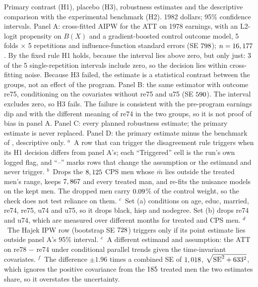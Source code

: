 \documentclass[11pt]{article}
\begin{document}
\begin{table}[tbp]
\centering
\caption{Primary contrast (H1), placebo (H3), robustness estimates and the descriptive
comparison with the experimental benchmark (H2). 1982 dollars; 95\% confidence intervals.
Panel A: cross-fitted AIPW for the ATT on 1978 earnings, with an L2-logit propensity on
$B(X)$ and a gradient-boosted control outcome model, 5 folds $\times$ 5 repetitions and
influence-function standard errors (SE $\PrimarySe$); $n = \PrimaryN$. By the fixed rule H1
holds, because the interval lies above zero, but only just: $\PrimaryNRepsCiIncludeZero$ of
the 5 single-repetition intervals include zero, so the decision lies within cross-fitting
noise. Because H3 failed, the estimate is a statistical contrast between the groups, not an
effect of the program. Panel B: the same estimator with outcome re75, conditioning on the
covariates without re75 and u75 (SE $\PlaceboSe$). The interval excludes zero, so H3 fails.
The failure is consistent with the pre-program earnings dip and with the different meaning
of re74 in the two groups, so it is not proof of bias in panel A. Panel C: every planned
robustness estimate; the primary estimate is never replaced. Panel D: the primary estimate
minus the benchmark of \citet[Table~3]{dehejia1999}, descriptive only.
$^{a}$~A row that can trigger the disagreement rule triggers when its H1 decision differs
from panel A's; each ``Triggered'' cell is the run's own logged flag, and ``--'' marks rows
that change the assumption or the estimand and never trigger.
$^{b}$~Drops the $\TrimNControlDropped$ CPS men whose $\bar m$ lies outside the treated
men's range, keeps $\TrimNControlKept$ and every treated man, and re-fits the nuisance
models on the kept men. The dropped men carry $\TrimDroppedWeightShare$\% of the control
weight, so the check does not test reliance on them.
$^{c}$~Set (a) conditions on age, educ, married, re74, re75, u74 and u75, so it drops black,
hisp and nodegree. Set (b) drops re74 and u74, which are measured over different months for
treated and CPS men.
$^{d}$~The Hajek IPW row (bootstrap SE $\IpwSe$) triggers only if its point estimate lies
outside panel A's 95\% interval.
$^{e}$~A different estimand and assumption: the ATT on re78 $-$ re74 under conditional
parallel trends given the time-invariant covariates.
$^{f}$~The difference $\pm 1.96$ times a combined SE of $\HTwoSeCombined$,
$\sqrt{\mathrm{SE}^2 + \HTwoBenchmarkSe^2}$, which ignores the positive covariance from the
$\PrimaryNTreated$ treated men the two estimates share, so it overstates the uncertainty.}
\label{tab:main}
\footnotesize
\setlength{\tabcolsep}{4pt}
\resizebox{\textwidth}{!}{}
\end{table}
\end{document}
